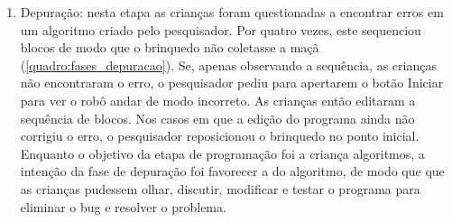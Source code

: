 \begin{enumerate}
    A complexidade da solução de cada uma das fases apresentadas é crescente. Enquanto a primeira fase exige apenas um comando, enquanto a segunda exige dois. A terceira fase também exige dois comandos, porém acrescenta o comando de giro. Além do maior número de comandos, a orientação da criança em relação é outro fator que dificulta a resolução. Nas fases 1 e 2 a criança programa o robô estando na mesma orientação que ele. Nas fases 3 a 5, porém, o robô está com seu lado direito voltado para a criança, e portanto ela precisa imaginar-se em outra perspectiva\footnote{Piaget e Inhelder (1981) citam a dificuldade que crianças tem de imaginar-se em outra perspectiva (egocentrismo). }.
    
    Dúvidas e erros surgiram com frequência durante a programação, e o pesquisador auxiliou fazendo perguntas e dando exemplos quando necessário, e explicando as regras e direções.
    
    \item Depuração: nesta etapa as crianças foram questionadas a encontrar erros em um algoritmo criado pelo pesquisador. Por quatro vezes, este sequenciou blocos de modo que o brinquedo não coletasse a maçã (\autoref{quadro:fases_depuracao}). Se, apenas observando a sequência, as crianças não encontraram o erro, o pesquisador pediu para apertarem o botão Iniciar para ver o robô andar de modo incorreto. As crianças então editaram a sequência de blocos. Nos casos em que a edição do programa ainda não corrigiu o erro, o pesquisador reposicionou o brinquedo no ponto inicial. Enquanto o objetivo da etapa de programação foi a criança  algoritmos, a intenção da fase de depuração foi favorecer a  do algoritmo, de modo que que as crianças pudessem olhar, discutir, modificar e testar o programa para eliminar o bug e resolver o problema.
\end{enumerate}

